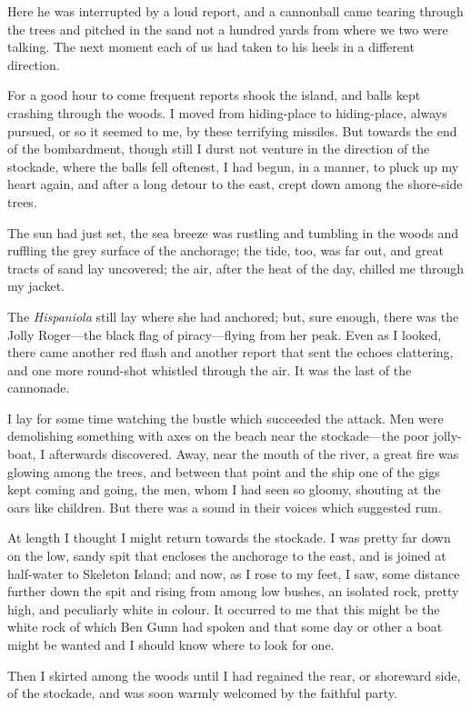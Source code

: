 Here he was interrupted by a loud report, and a cannonball came tearing through the trees and pitched in the sand not a hundred yards from where we two were talking. The next moment each of us had taken to his heels in a different direction.

For a good hour to come frequent reports shook the island, and balls kept crashing through the woods. I moved from hiding-place to hiding-place, always pursued, or so it seemed to me, by these terrifying missiles. But towards the end of the bombardment, though still I durst not venture in the direction of the stockade, where the balls fell oftenest, I had begun, in a manner, to pluck up my heart again, and after a long detour to the east, crept down among the shore-side trees.

The sun had just set, the sea breeze was rustling and tumbling in the woods and ruffling the grey surface of the anchorage; the tide, too, was far out, and great tracts of sand lay uncovered; the air, after the heat of the day, chilled me through my jacket.

The \textit{Hispaniola} still lay where she had anchored; but, sure enough, there was the Jolly Roger---the black flag of piracy---flying from her peak. Even as I looked, there came another red flash and another report that sent the echoes clattering, and one more round-shot whistled through the air. It was the last of the cannonade.

I lay for some time watching the bustle which succeeded the attack. Men were demolishing something with axes on the beach near the stockade---the poor jolly-boat, I afterwards discovered. Away, near the mouth of the river, a great fire was glowing among the trees, and between that point and the ship one of the gigs kept coming and going, the men, whom I had seen so gloomy, shouting at the oars like children. But there was a sound in their voices which suggested rum.

At length I thought I might return towards the stockade. I was pretty far down on the low, sandy spit that encloses the anchorage to the east, and is joined at half-water to Skeleton Island; and now, as I rose to my feet, I saw, some distance further down the spit and rising from among low bushes, an isolated rock, pretty high, and peculiarly white in colour. It occurred to me that this might be the white rock of which Ben Gunn had spoken and that some day or other a boat might be wanted and I should know where to look for one.

Then I skirted among the woods until I had regained the rear, or shoreward side, of the stockade, and was soon warmly welcomed by the faithful party.

